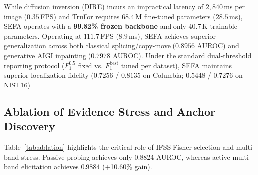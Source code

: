 \documentclass[10pt,journal,compsoc]{IEEEtran}
\begin{document}
While diffusion inversion (DIRE) incurs an impractical latency of $2,840$\,ms per image ($0.35$\,FPS) and TruFor requires $68.4$\,M fine-tuned parameters ($28.5$\,ms), SEFA operates with a \textbf{99.82\% frozen backbone} and only $40.7$\,K trainable parameters. Operating at $111.7$\,FPS ($8.9$\,ms), SEFA achieves superior generalization across both classical splicing/copy-move ($0.8956$ AUROC) and generative AIGI inpainting ($0.7978$ AUROC). Under the standard dual-threshold reporting protocol ($F_1^{0.5}$ fixed vs. $F_1^{\text{best}}$ tuned per dataset), SEFA maintains superior localization fidelity ($0.7256$ / $0.8135$ on Columbia; $0.5448$ / $0.7276$ on NIST16).

\begin{table}[t]
\centering
\caption{State-of-the-Art Baseline Comparison Across Classical and Modern AIGI Benchmarks.}
\label{tab:baselines}
\end{table}

\subsection{Ablation of Evidence Stress and Anchor Discovery}
Table~\ref{tab:ablation} highlights the critical role of IFSS Fisher selection and multi-band stress. Passive probing achieves only 0.8824 AUROC, whereas active multi-band elicitation achieves 0.9884 (+10.60\% gain).
\end{document}

